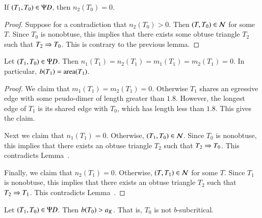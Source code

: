 \begin{corollary}
If $(T_1,T_0)\in\Psi D$, then $n_2(T_0)=0$.
\end{corollary}

\begin{proof} Suppose for a contradiction that $n_2(T_0)>0$.  Then $(T,T_0)\in \mathcal N$ for some $T$.  Since $T_0$ is
nonobtuse, this implies that there exists some obtuse triangle $T_2$ such that $T_2\Rightarrow T_0$.  This is contrary
to the previous lemma.
\end{proof}

\begin{lemma} Let $(T_1,T_0)\in\Psi D$.  Then $n_1(T_1)=n_2(T_1)=m_1(T_1)=m_2(T_1)=0$.  In particular,
$b(T_1) = {\operatorname{area}}(T_1)$.
\end{lemma}

\begin{proof}  We claim that $m_1(T_1)=m_2(T_1)=0$.  Otherwise $T_1$ shares an egressive edge with some
peudo-dimer of length greater than $1.8$.  However, the longest edge of $T_1$ is its shared edge with $T_0$, which
has length less than $1.8$.  This gives the claim.

Next we claim that $n_1(T_1)=0$.  Otherwise, $(T_1,T_0)\in \mathcal N$.  Since $T_0$ is nonobtuse, this implies
that there exists an obtuse triangle $T_2$ such that $T_2\Rightarrow T_0$.  This contradicts Lemma~.

Finally, we claim that $n_2(T_1)=0$.  Otherwise, $(T,T_1)\in \mathcal N$ for some $T$.  Since $T_1$ is nonobtuse,
this implies that there exists an obtuse triangle $T_2$ such that $T_2\Rightarrow T_1$.  This contradicts
Lemma~.
\end{proof}

\begin{lemma}  Let $(T_1,T_0)\in\Psi D$.  Then $b(T_0) > a_K$.  That is, $T_0$ is not $b$-subcritical.
\end{lemma}

